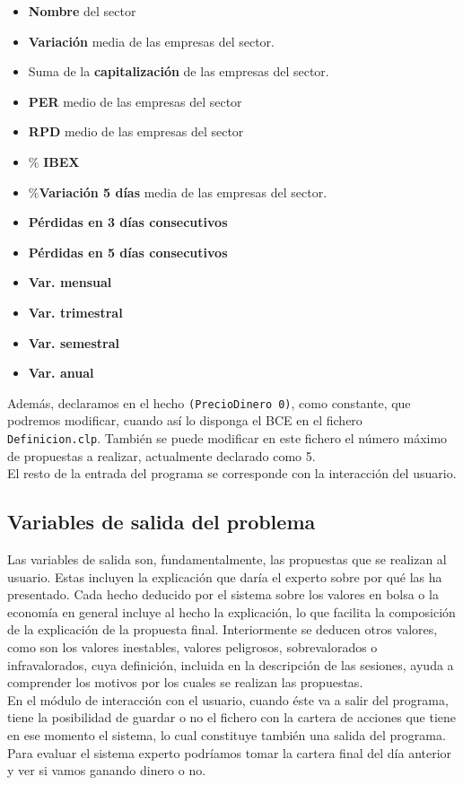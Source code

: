 \documentclass[11pt,leqno]{article}
\theoremstyle{definition_wo_parentheses}
\theoremstyle{plain}
\theoremstyle{remark}
\begin{document}
	\begin{itemize}
		\item \textbf{Nombre} del sector
		\item \textbf{Variación} media de las empresas del sector.
		\item Suma de la \textbf{capitalización} de las empresas del sector.
		\item \textbf{PER} medio de las empresas del sector
		\item \textbf{RPD} medio de las empresas del sector
		\item $\mathbf{\%}$ \textbf{IBEX}
		\item $\mathbf{\%}$\textbf{Variación 5 días} media de las empresas del sector.
		\item \textbf{Pérdidas en 3 días consecutivos}
		\item \textbf{Pérdidas en 5 días consecutivos}
		\item \textbf{Var. mensual}
		\item \textbf{Var. trimestral}
		\item \textbf{Var. semestral}
		\item \textbf{Var. anual}
	\end{itemize}
	
	Además, declaramos en el hecho \texttt{(PrecioDinero 0)}, como constante, que podremos modificar, cuando así lo disponga el BCE en el fichero \texttt{Definicion.clp}. También se puede modificar en este fichero el número máximo de propuestas a realizar, actualmente declarado como 5.\\
	El resto de la entrada del programa se corresponde con la interacción del usuario.
	
\subsection{Variables de salida del problema}
	
	Las variables de salida son, fundamentalmente, las propuestas que se realizan al usuario. Estas incluyen la explicación que daría el experto sobre por qué las ha presentado. Cada hecho deducido por el sistema sobre los valores en bolsa o la economía en general incluye al hecho la explicación, lo que facilita la composición de la explicación de la propuesta final. Interiormente se deducen otros valores, como son los valores inestables, valores peligrosos, sobrevalorados o infravalorados, cuya definición,  incluida en la descripción de las sesiones, ayuda a comprender los motivos por los cuales se realizan las propuestas.\\
	En el módulo de interacción con el usuario, cuando éste va a salir del programa, tiene la posibilidad de guardar o no el fichero con la cartera de acciones que tiene en ese momento el sistema, lo cual constituye también una salida del programa. Para evaluar el sistema experto podríamos tomar la cartera final del día anterior y ver si vamos ganando dinero o no.
	
\end{document}
